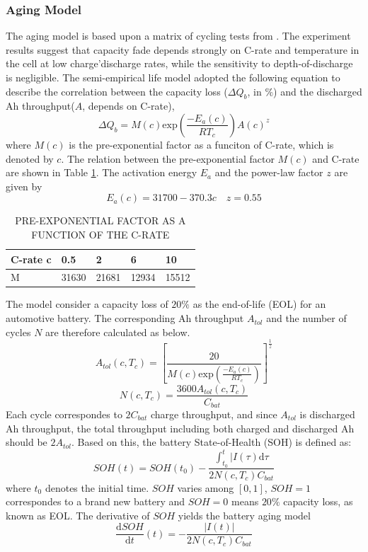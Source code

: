 \documentclass[10pt]{article}
\begin{document}
\subsubsection{Aging Model}
The aging model is based upon a matrix of cycling tests from \cite{ref:3}. The experiment results suggest that capacity fade depends strongly on C-rate and temperature in the cell at low charge'discharge rates, while the sensitivity to depth-of-discharge is negligible. The semi-empirical life model adopted the following equation to describe the correlation between the capacity loss ($\Delta Q_b$, in $\%$) and the discharged Ah throughput($A$, depends on C-rate),
\begin{equation}
	\Delta Q_b = M(c)\mathrm{exp}\left(\frac{-E_a(c)}{RT_c}\right)A(c)^z
\end{equation}
where $M(c)$ is the pre-exponential factor as a funciton of C-rate, which is denoted by $c$. The relation between the pre-exponential factor $M(c)$ and C-rate are shown in Table \ref{t6}. The activation energy $E_a$ and the power-law factor $z$ are given by
\begin{equation}
	E_a(c)=31700-370.3c  \quad z=0.55
\end{equation}
\begin{table}[H]
	\caption{PRE-EXPONENTIAL FACTOR AS A FUNCTION OF THE C-RATE}
	\vspace{-0.4cm}
	\centering
	\begin{tabular}{lllll}
		\hline
		C-rate c & 0.5 & 2 & 6 & 10 \\
		\hline
		M & 31630 & 21681 & 12934 & 15512  \\
		\hline
	\end{tabular}
\label{t6}
\end{table}
\noindent The model consider a capacity loss of $20\%$ as the end-of-life (EOL) for an automotive battery. The corresponding Ah throughput $A_{tol}$ and the number of cycles $N$ are therefore calculated as below.
\begin{equation}
A_{tol} (c, T_c) = \left[ \frac{20}{M(c)\mathrm{exp}\left(\frac{-E_a(c)}{RT_c}\right)} \right]^{\frac{1}{z}}
\end{equation}
\begin{equation}
N(c, T_c) = \frac{3600A_{tol} (c, T_c) }{C_{bat}}
\end{equation}
Each cycle correspondes to $2C_{bat}$ charge throughput, and since $A_{tol}$ is discharged Ah throughput, the total throughput including both charged and discharged Ah should be $2A_{tol}$. Based on this, the battery State-of-Health (SOH) is defined as: 
\begin{equation}
SOH(t) = SOH(t_0)-\frac{\int_{t_0}^{t}|I(\tau)\mathrm{d}\tau}{2N(c, T_c) C_{bat}}
\end{equation}
where $t_0$ denotes the initial time. $SOH$ varies among $[0,1]$, $SOH=1$ correspondes to a brand new battery and $SOH=0$  means $20\%$ capacity loss, as known as EOL. The derivative of $SOH$ yields the battery aging model
\begin{equation}
	\frac{\mathrm{d} SOH}{\mathrm{d}t}(t) = -\frac{|I(t)|}{2N(c, T_c) C_{bat}}
\end{equation}
\end{document}

